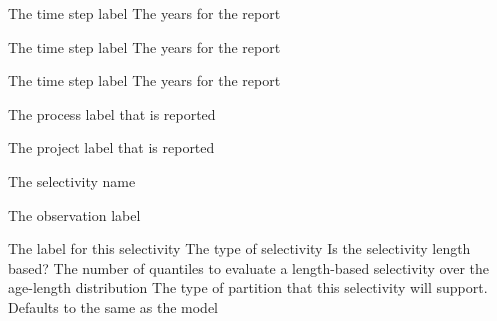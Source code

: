  {The time step label}
 {The years for the report}
\par\textbf{}\par
{} {The time step label}
 {The years for the report}
\par\textbf{}\par
{} {The time step label}
 {The years for the report}
\par\textbf{}\par
\par\textbf{}\par
{} {The process label that is reported}
\par\textbf{}\par
{} {The project label that is reported}
\par\textbf{}\par
\par\textbf{}\par
{} {The selectivity name}
\par\textbf{}\par
{} {The observation label}
\par\textbf{}\par
\par\textbf{}\par
{}\par\par
{} {The label for this selectivity}
 {The type of selectivity}
 {Is the selectivity length based?}
 {The number of quantiles to evaluate a length-based selectivity over the age-length distribution}
 {The type of partition that this selectivity will support. Defaults to the same as the model}
 {}
 {}
\par\textbf{}\par
